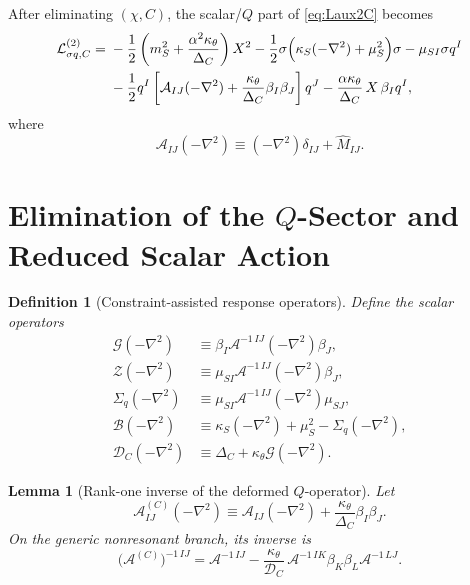 \documentclass[11pt]{article}
\newtheorem{definition}{Definition}
\newtheorem{lemma}{Lemma}
\begin{document}
After eliminating \((\chi,C)\), the scalar/\(Q\) part of \eqref{eq:Laux2C} becomes
\begin{align}
\mathcal L_{\sigma q,C}^{(2)}
=\;&
-\frac{1}{2}\left(m_S^2+\frac{\alpha^2\kappa_\theta}{\Delta_C}\right)X^2
-\frac{1}{2}\sigma\Bigl(\kappa_S(-\nabla^2)+\mu_S^2\Bigr)\sigma
-\mu_{SI}\sigma q^I
\nonumber\\
&-\frac{1}{2}q^I
\left[
\mathcal A_{IJ}(-\nabla^2)
+\frac{\kappa_\theta}{\Delta_C}\beta_I\beta_J
\right]
q^J
-\frac{\alpha\kappa_\theta}{\Delta_C}\,X\,\beta_Iq^I,
\label{eq:LsigmaqC}
\end{align}
where
\begin{equation}
\mathcal A_{IJ}(-\nabla^2)
\equiv
(-\nabla^2)\delta_{IJ}+\widehat M_{IJ}.
\label{eq:Aoperator}
\end{equation}

\section{Elimination of the \texorpdfstring{\(Q\)}{Q}-Sector and Reduced Scalar Action}

\begin{definition}[Constraint-assisted response operators]
Define the scalar operators
\begin{align}
\mathcal G(-\nabla^2)
&\equiv
\beta_I\mathcal A^{-1\,IJ}(-\nabla^2)\beta_J,
\label{eq:Goperator}
\\
\mathcal Z(-\nabla^2)
&\equiv
\mu_{SI}\mathcal A^{-1\,IJ}(-\nabla^2)\beta_J,
\label{eq:Zoperator}
\\
\Sigma_q(-\nabla^2)
&\equiv
\mu_{SI}\mathcal A^{-1\,IJ}(-\nabla^2)\mu_{SJ},
\label{eq:Sigmaoperator}
\\
\mathcal B(-\nabla^2)
&\equiv
\kappa_S(-\nabla^2)+\mu_S^2-\Sigma_q(-\nabla^2),
\label{eq:Boperator}
\\
\mathcal D_C(-\nabla^2)
&\equiv
\Delta_C+\kappa_\theta\mathcal G(-\nabla^2).
\label{eq:DCoperator}
\end{align}
\end{definition}

\begin{lemma}[Rank-one inverse of the deformed \(Q\)-operator]
Let
\begin{equation}
\mathcal A^{(C)}_{IJ}(-\nabla^2)
\equiv
\mathcal A_{IJ}(-\nabla^2)
+\frac{\kappa_\theta}{\Delta_C}\beta_I\beta_J.
\label{eq:ACoperator}
\end{equation}
On the generic nonresonant branch, its inverse is
\begin{equation}
\bigl(\mathcal A^{(C)}\bigr)^{-1\,IJ}
=
\mathcal A^{-1\,IJ}
-\frac{\kappa_\theta}{\mathcal D_C}\,
\mathcal A^{-1\,IK}\beta_K\beta_L\mathcal A^{-1\,LJ}.
\label{eq:ACinverse}
\end{equation}
\end{lemma}
\end{document}
